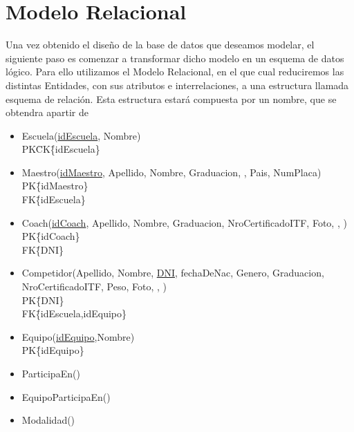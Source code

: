 \section{Modelo Relacional}

Una vez obtenido el diseño de la base de datos que deseamos modelar, el siguiente paso es comenzar a transformar dicho modelo en un esquema de datos lógico. Para ello utilizamos el Modelo Relacional, en el que cual reduciremos las distintas Entidades, con sus atributos e interrelaciones, a una estructura llamada esquema de relación. Esta estructura estará compuesta por un nombre, que se obtendra apartir de 

\begin{itemize}

\item{Escuela(\underline{idEscuela}, Nombre)\\
PK\=CK\=\{idEscuela\}}

\item{Maestro(\underline{idMaestro}, Apellido, Nombre, Graduacion, , Pais, NumPlaca)\\
PK\=\{idMaestro\} \\
FK\=\{idEscuela\} \\
}

\item{Coach(\underline{idCoach}, Apellido, Nombre, Graduacion, NroCertificadoITF, Foto, , )\\
PK\=\{idCoach\} \\
FK\=\{DNI\} \\
}

\item{Competidor(Apellido, Nombre, \underline{DNI}, fechaDeNac, Genero, Graduacion, NroCertificadoITF, Peso, Foto, , ) \\
PK\=\{DNI\} \\
FK\=\{idEscuela,idEquipo\}
}
\item{Equipo(\underline{idEquipo},Nombre)\\
PK\=\{idEquipo\} \\
}

\item ParticipaEn()

\item{EquipoParticipaEn()

}

\item Modalidad()


\end{itemize}
